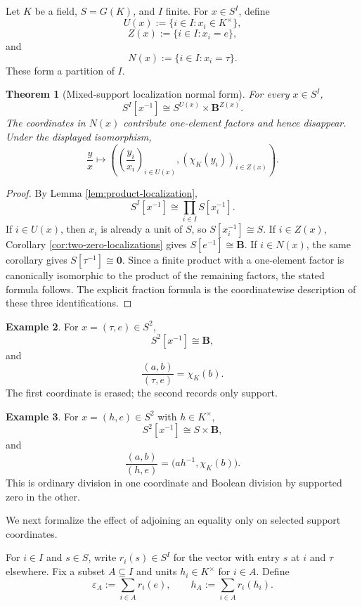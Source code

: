 \documentclass[11pt]{amsart}
\numberwithin{equation}{section}
\newtheorem{theorem}{Theorem}[section]
\theoremstyle{definition}
\newtheorem{example}[theorem]{Example}
\newcommand{\B}{\mathbf B}
\newcommand{\zero}{\mathbf 0}
\newcommand{\eps}{\varepsilon}
\begin{document}
Let $K$ be a field, $S=G(K)$, and $I$ finite.  For $x\in S^I$, define
\[
U(x):=\{i\in I:x_i\in K^\times\},
\]
\[
Z(x):=\{i\in I:x_i=e\},
\]
and
\[
N(x):=\{i\in I:x_i=\tau\}.
\]
These form a partition of $I$.

\begin{theorem}[Mixed-support localization normal form]\label{thm:mixed-localization}
For every $x\in S^I$,
\[
S^I[x^{-1}]
\cong
S^{U(x)}\times\B^{Z(x)}.
\]
The coordinates in $N(x)$ contribute one-element factors and hence disappear.  Under the displayed isomorphism,
\[
\frac{y}{x}
\longmapsto
\left(
\left(\frac{y_i}{x_i}\right)_{i\in U(x)},
\left(\chi_K(y_i)\right)_{i\in Z(x)}
\right).
\]
\end{theorem}

\begin{proof}
By Lemma \ref{lem:product-localization},
\[
S^I[x^{-1}]
\cong
\prod_{i\in I}S[x_i^{-1}].
\]
If $i\in U(x)$, then $x_i$ is already a unit of $S$, so $S[x_i^{-1}]\cong S$.  If $i\in Z(x)$, Corollary \ref{cor:two-zero-localizations} gives $S[e^{-1}]\cong\B$.  If $i\in N(x)$, the same corollary gives $S[\tau^{-1}]\cong\zero$.  Since a finite product with a one-element factor is canonically isomorphic to the product of the remaining factors, the stated formula follows.  The explicit fraction formula is the coordinatewise description of these three identifications.
\end{proof}

\begin{example}
For $x=(\tau,e)\in S^2$,
\[
S^2[x^{-1}]\cong\B,
\]
and
\[
\frac{(a,b)}{(\tau,e)}=\chi_K(b).
\]
The first coordinate is erased; the second records only support.
\end{example}

\begin{example}
For $x=(h,e)\in S^2$ with $h\in K^\times$,
\[
S^2[x^{-1}]\cong S\times\B,
\]
and
\[
\frac{(a,b)}{(h,e)}=\bigl(ah^{-1},\chi_K(b)\bigr).
\]
This is ordinary division in one coordinate and Boolean division by supported zero in the other.
\end{example}

We next formalize the effect of adjoining an equality only on selected support coordinates.

For $i\in I$ and $s\in S$, write $r_i(s)\in S^I$ for the vector with entry $s$ at $i$ and $\tau$ elsewhere.  Fix a subset $A\subseteq I$ and units $h_i\in K^\times$ for $i\in A$.  Define
\[
\eps_A:=\sum_{i\in A}r_i(e),
\qquad
h_A:=\sum_{i\in A}r_i(h_i).
\]
\end{document}
